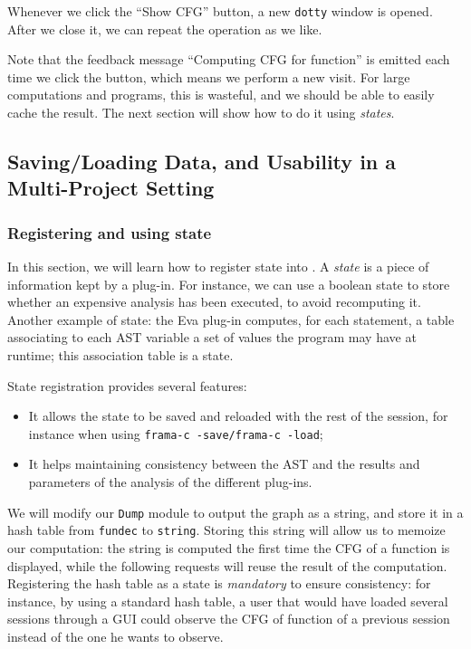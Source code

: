 Whenever we click the ``Show CFG'' button, a new \texttt{dotty} window is
opened. After we close it, we can repeat the operation as we like.

Note that the feedback message ``Computing CFG for function'' is emitted
each time we click the button, which means we perform a new visit.
For large computations and programs, this is wasteful,
and we should be able to easily cache the result.
The next section will show how to do it using {\em states}.

\subsection{Saving/Loading Data, and Usability in a Multi-Project Setting}
\label{tut2:project-and-state}

\subsubsection{Registering and using state}

In this section, we will learn how to register state into \framac. A
\emph{state} is a piece of information kept by a plug-in. For instance, we can
use a boolean state to store whether an expensive analysis has been executed,
to avoid recomputing it. Another example of state: the \textsf{Eva} plug-in
computes, for each statement, a table associating to each AST variable a set of
values the program may have at runtime; this association table is a state.

State registration provides several features:
\begin{itemize}
\item It allows the state to be saved and reloaded with the rest of
  the session, for instance when using \texttt{frama-c -save/frama-c
    -load};
\item It helps maintaining consistency between the AST and the results and
  parameters of the analysis of the different plug-ins.
\end{itemize}

We will modify our \verb|Dump| module to output the \dottool graph as a string,
and store it in a hash table from \texttt{fundec} to \texttt{string}.
Storing this string will allow us to memoize~\cite{michie68}
our computation: the string is computed the first time the CFG of a
function is displayed, while the following requests will reuse the result of
the computation. Registering the hash table as a \framac state is
\emph{mandatory} to ensure \framac consistency: for instance, by using a
standard \caml hash table, a user that would have loaded several sessions through
a GUI could observe the CFG of function of a previous session instead of the
one he wants to observe.

